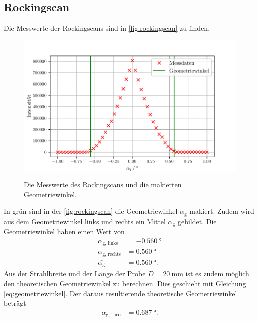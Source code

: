 \subsection{Rockingscan}
Die Messwerte der Rockingscans sind in \autoref{fig:rockingscan} zu finden.
\begin{figure}
    \centering
    \caption{Die Messwerte des Rockingscans und die makierten Geometriewinkel.}
    \includegraphics[width=\textwidth]{content/data/rockingscan.pdf}
    \label{fig:rockingscan}
\end{figure}
In grün sind in der \autoref{fig:rockingscan} die Geometriewinkel $\alpha_\text{g}$ makiert.
Zudem wird aus dem Geometriewinkel links und rechts ein Mittel $\bar{\alpha_\text{g}}$ gebildet.
Die Geometriewinkel haben einen Wert von 
\begin{align*}
    \alpha_\text{g, links} &= \SI{-0.560}{\degree} \\
    \alpha_\text{g, rechts} &= \SI{0.560}{\degree} \\
    \bar{\alpha_\text{g}} &= \SI{0.560}{\degree}.
\end{align*}
Aus der Strahlbreite und der Länge der Probe $D=\SI{20}{\milli\meter}$ ist es zudem möglich den theoretischen Geometriewinkel zu berechnen.
Dies geschieht mit Gleichung \eqref{eq:geometriewinkel}.
Der daraus resultierende theoretische Geometriewinkel beträgt
\begin{align*}
    \alpha_\text{g, theo} &= \SI{0.687}{\degree}.
\end{align*}
\FloatBarrier
